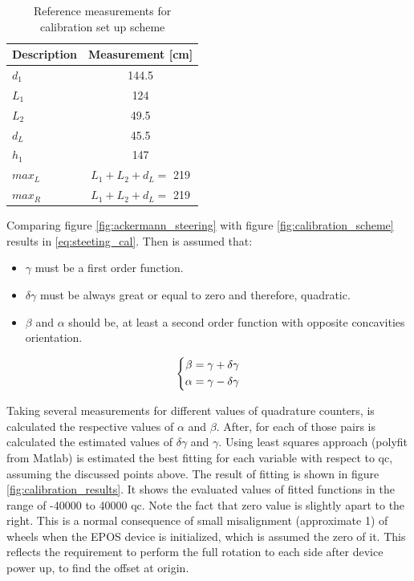 \begin{table}[!hb]
	\centering
	\begin{tabular}{lc}
		\toprule
		\textbf{Description} & \textbf{Measurement [cm]}\\
		\midrule
		$d_1$ & 144.5\\
		$L_1$ & 124\\
		$L_2$ & 49.5\\
		$d_L$ & 45.5\\
		$h_1$ & 147\\
		$max_L$ & $L_1+L_2+d_L=$ 219\\
		$max_R$ & $L_1+L_2+d_L=$ 219\\
		\bottomrule
	\end{tabular}
	\caption{Reference measurements for calibration set up scheme}
	\label{tab:calibration_scheme}
\end{table}

Comparing figure \ref{fig:ackermann_steering} with figure \ref{fig:calibration_scheme} results in \eqref{eq:steeting_cal}. Then is assumed that:
\begin{itemize}
	\tightlist
	\item $\gamma$ must be a first order function.
	\item $\delta \gamma$ must be always great or equal to zero and therefore, quadratic.
	\item $\beta$ and $\alpha$ should be, at least a second order function with opposite concavities orientation.
\end{itemize}


\begin{equation}
\centering
\left \lbrace \begin{aligned}
\beta &= \gamma + \delta \gamma\\
\alpha&= \gamma - \delta \gamma
\end{aligned}
\right.
\label{eq:steeting_cal}
\end{equation}

Taking several measurements for different values of quadrature counters, is calculated the respective values of $\alpha$ and $\beta$. After, for each of those pairs is calculated the estimated values of $\delta \gamma$ and $\gamma$. Using least squares approach (\gls{polyfit} from Matlab\textregistered) is estimated the best fitting for each variable with respect to \gls{qc}, assuming the discussed points above. The result of fitting is shown in figure \ref{fig:calibration_results}. It shows the evaluated values of fitted functions in the range of -40000 to 40000 \gls{qc}. Note the fact that zero value is slightly apart to the right. This is a normal consequence of small misalignment (approximate 1\degree) of wheels when the \gls{EPOS} device is initialized, which is assumed the zero of it. This reflects the requirement to perform the full rotation to each side after device power up, to find the offset at origin.

